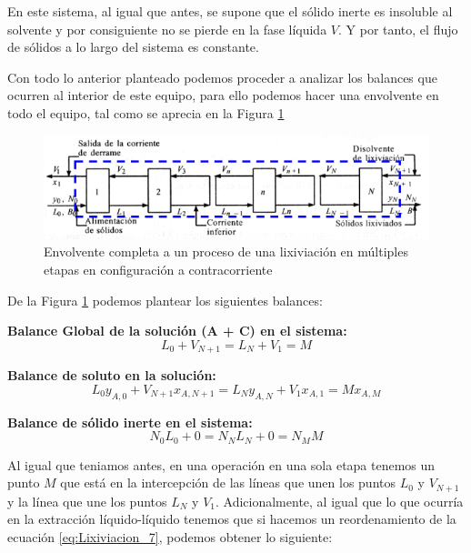 \documentclass[11pt]{book}
\begin{document}
En este sistema, al igual que antes, se supone que el sólido inerte es insoluble al solvente y por consiguiente no se pierde en la fase líquida $V$. Y por tanto, el flujo de sólidos a lo largo del sistema es constante. 

Con todo lo anterior planteado podemos proceder a analizar los balances que ocurren al interior de este equipo, para ello podemos hacer una envolvente en todo el equipo, tal como se aprecia en la Figura \ref{fig:Lixiviacion_6}

\begin{figure}[H]
    \centering
    \includegraphics[width = 13 cm]{img/lixiviacion/EquilibrioLixiviacion_6.PNG}
    \caption{Envolvente completa a un proceso de una lixiviación en múltiples etapas en configuración a contracorriente}
    \label{fig:Lixiviacion_6}
\end{figure}

De la Figura \ref{fig:Lixiviacion_6} podemos plantear los siguientes balances:

\textbf{Balance Global de la solución (A + C) en el sistema:}
\begin{equation}
    \label{eq:Lixiviacion_7}
    L_0 + V_{N+1} = L_N + V_{1} = M
\end{equation}

\textbf{Balance de soluto en la solución:}
\begin{equation}
    \label{eq:Lixiviacion_8}
    L_0 y_{A,0} + V_{N+1} x_{A, N+1} = L_N y_{A,N} + V_{1} x_{A,1} = M x_{A,M}
\end{equation}

\textbf{Balance de sólido inerte en el sistema:}
\begin{equation}
    \label{eq:Lixiviacion_9}
    N_0 L_0 + 0 = N_N L_N  + 0 = N_M M
\end{equation}

Al igual que teniamos antes, en una operación en una sola etapa tenemos un punto $M$ que está en la intercepción de las líneas que unen los puntos $L_0$ y $V_{N+1}$ y la línea que une los puntos $L_N$ y $V_1$. Adicionalmente, al igual que lo que ocurría en la extracción líquido-líquido tenemos que si hacemos un reordenamiento de la ecuación \ref{eq:Lixiviacion_7}, podemos obtener lo siguiente:
\end{document}
